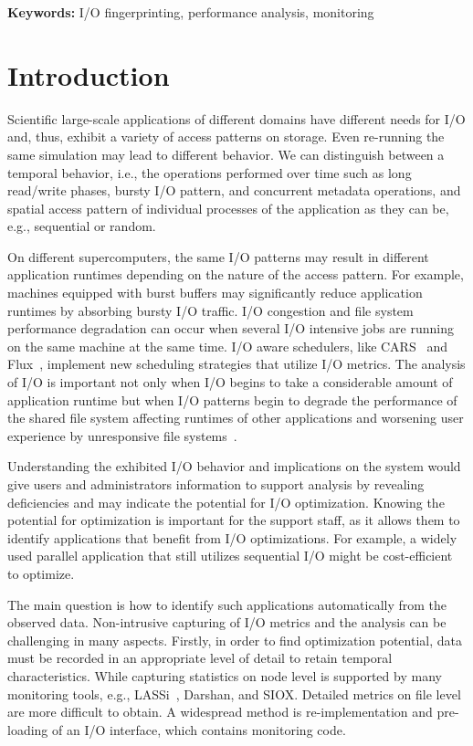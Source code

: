 \documentclass{jhps}
\begin{document}
\textbf{Keywords: }I/O fingerprinting, performance analysis, monitoring

\section{Introduction}
Scientific large-scale applications of different domains have different needs for I/O and, thus, exhibit a variety of access patterns on storage.
Even re-running the same simulation may lead to different behavior.
We can distinguish between a temporal behavior, i.e., the operations performed over time such as long read/write phases, bursty I/O pattern, and concurrent metadata operations, and spatial access pattern of individual processes of the application as they can be, e.g., sequential or random.

On different supercomputers, the same I/O patterns may result in different application runtimes depending on the nature of the access pattern.
For example, machines equipped with burst buffers \cite{10.1007/978-3-030-02465-9_9, 7004215} may significantly reduce application runtimes by absorbing bursty I/O traffic.
I/O congestion and file system performance degradation can occur when several I/O intensive jobs are running on the same machine at the same time.
I/O aware schedulers, like CARS~\cite{LIANG201925} and Flux~\cite{flux}, implement new scheduling strategies that utilize I/O metrics.
The analysis of I/O is important not only when I/O begins to take a considerable amount of application runtime but when I/O patterns begin to degrade the performance of the shared file system affecting runtimes of other applications and worsening user experience by unresponsive file systems~\cite{10.1007/978-3-030-02465-9_5}.

Understanding the exhibited I/O behavior and implications on the system would give users and administrators information to support analysis by revealing deficiencies and may indicate the potential for I/O optimization.
Knowing the potential for optimization is important for the support staff, as it allows them to identify applications that benefit from I/O optimizations.
For example, a widely used parallel application that still utilizes sequential I/O might be cost-efficient to optimize.

The main question is how to identify such applications automatically from the observed data.
Non-intrusive capturing of I/O metrics and the analysis can be challenging in many aspects.
Firstly, in order to find optimization potential, data must be recorded in an appropriate level of detail to retain temporal characteristics.
While capturing statistics on node level is supported by many monitoring tools, e.g., LASSi~\cite{sivalingam2019lassi}, Darshan\cite{hpcdarshan}, and SIOX\cite{TSACAMAOOP14}.
Detailed metrics on file level are more difficult to obtain.
A widespread method is re-implementation and pre-loading of an I/O interface, which contains monitoring code.
\end{document}
